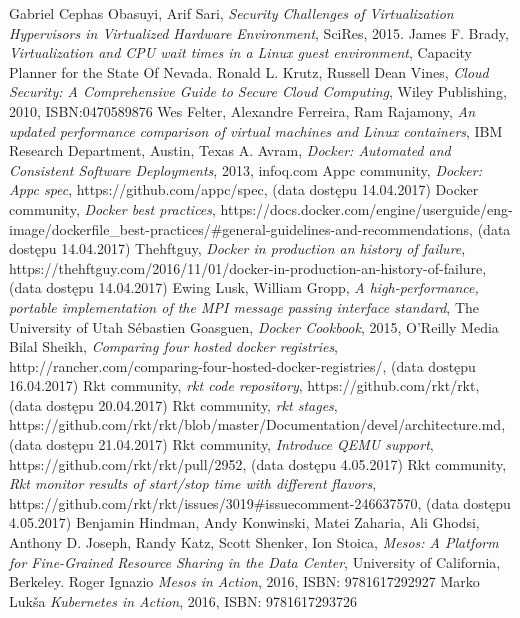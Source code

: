 \documentclass[10pt,a4paper,titlepage,twoside]{report}
\begin{document}
\begin{thebibliography}{99}
Gabriel Cephas Obasuyi, Arif Sari, \textit{Security Challenges of Virtualization Hypervisors in Virtualized Hardware Environment}, SciRes, 2015.
James F. Brady, \textit{Virtualization and CPU wait times in a Linux guest environment}, Capacity Planner for the State Of Nevada.
Ronald L. Krutz, Russell Dean Vines, \textit{Cloud Security: A Comprehensive Guide to Secure Cloud Computing}, Wiley Publishing, 2010, ISBN:0470589876
Wes Felter, Alexandre Ferreira, Ram Rajamony, \textit{An updated performance comparison of virtual machines and Linux containers}, IBM Research Department, Austin, Texas
A. Avram, \textit{Docker: Automated and Consistent Software Deployments}, 2013, infoq.com
Appc community, \textit{Docker: Appc spec}, https://github.com/appc/spec, (data dostępu 14.04.2017)
Docker community, \textit{Docker best practices}, https://docs.docker.com/engine/userguide/eng-image/dockerfile\_best-practices/\#general-guidelines-and-recommendations, (data dostępu 14.04.2017)
Thehftguy, \textit{Docker in production an history of failure}, https://thehftguy.com/2016/11/01/docker-in-production-an-history-of-failure, (data dostępu 14.04.2017)
Ewing Lusk, William Gropp, \textit{A high-performance, portable implementation of the MPI message passing interface standard}, The University of Utah
Sébastien Goasguen, \textit{Docker Cookbook}, 2015, O'Reilly Media
Bilal Sheikh, \textit{Comparing four hosted docker registries}, http://rancher.com/comparing-four-hosted-docker-registries/, (data dostępu 16.04.2017)
Rkt community, \textit{rkt code repository}, https://github.com/rkt/rkt, (data dostępu 20.04.2017)
Rkt community, \textit{rkt stages}, https://github.com/rkt/rkt/blob/master/Documentation/devel/architecture.md, (data dostępu 21.04.2017)
Rkt community, \textit{Introduce QEMU support}, https://github.com/rkt/rkt/pull/2952, (data dostępu 4.05.2017)
Rkt community, \textit{Rkt monitor results of start/stop time with different flavors}, https://github.com/rkt/rkt/issues/3019\#issuecomment-246637570, (data dostępu 4.05.2017)
Benjamin Hindman, Andy Konwinski, Matei Zaharia, Ali Ghodsi, Anthony D. Joseph, Randy Katz, Scott Shenker, Ion Stoica, \textit{Mesos: A Platform for Fine-Grained Resource Sharing in the Data Center}, University of California, Berkeley.
Roger Ignazio \textit{Mesos in Action}, 2016, ISBN: 9781617292927 
Marko Lukša \textit{Kubernetes in Action}, 2016, ISBN: 9781617293726

\end{thebibliography}
\end{document}
